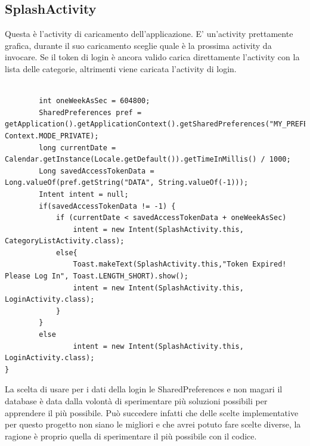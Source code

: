 \documentclass[12pt]{article}
\begin{document}
    \subsection{SplashActivity}
    Questa è l'activity di caricamento dell'applicazione. E' un'activity prettamente grafica, durante il suo caricamento sceglie quale è la prossima activity
    da invocare. Se il token di login è ancora valido carica direttamente l'activity con la lista delle categorie, altrimenti viene caricata l'activity di login.
    \begin{lstlisting}
    
        int oneWeekAsSec = 604800;
        SharedPreferences pref = getApplication().getApplicationContext().getSharedPreferences("MY_PREFERENCES", Context.MODE_PRIVATE);
        long currentDate = Calendar.getInstance(Locale.getDefault()).getTimeInMillis() / 1000;
        Long savedAccessTokenData = Long.valueOf(pref.getString("DATA", String.valueOf(-1)));
        Intent intent = null;
        if(savedAccessTokenData != -1) {
            if (currentDate < savedAccessTokenData + oneWeekAsSec)
                intent = new Intent(SplashActivity.this, CategoryListActivity.class);
            else{
                Toast.makeText(SplashActivity.this,"Token Expired! Please Log In", Toast.LENGTH_SHORT).show();
                intent = new Intent(SplashActivity.this, LoginActivity.class);
            }
        }
        else
                intent = new Intent(SplashActivity.this, LoginActivity.class);
}
    \end{lstlisting}
    
    La scelta di usare per i dati della login le SharedPreferences e non magari il database è data dalla volontà di sperimentare più soluzioni possibili
    per apprendere il più possibile. Può succedere infatti che delle scelte implementative per questo progetto non siano le migliori e che avrei potuto fare
    scelte diverse, la ragione è proprio quella di sperimentare il più possibile con il codice.\\
\end{document}
